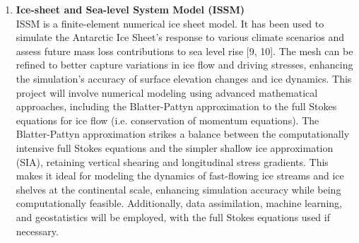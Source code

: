 \begin{enumerate}
    \item\textbf{Ice-sheet and Sea-level System Model (ISSM)}~\cite{ISSM}\\
    ISSM is a finite-element numerical ice sheet model. It has been used to simulate the Antarctic Ice Sheet’s response to various climate scenarios and assess future mass loss contributions to sea level rise [9, 10]. The mesh can be refined to better capture variations in ice flow and driving stresses, enhancing the simulation’s accuracy of surface elevation changes and ice dynamics. This project will involve numerical modeling using advanced mathematical approaches, including the Blatter-Pattyn approximation to the full Stokes equations for ice flow (i.e. conservation of momentum equations). The Blatter-Pattyn approximation strikes a balance between the computationally intensive full Stokes equations and the simpler shallow ice approximation (SIA), retaining vertical shearing and longitudinal stress gradients. This makes it ideal for modeling the dynamics of fast-flowing ice streams and ice shelves at the continental scale, enhancing simulation accuracy while being computationally feasible. Additionally, data assimilation, machine learning, and geostatistics will be employed, with the full Stokes equations used if necessary.
\end{enumerate}


